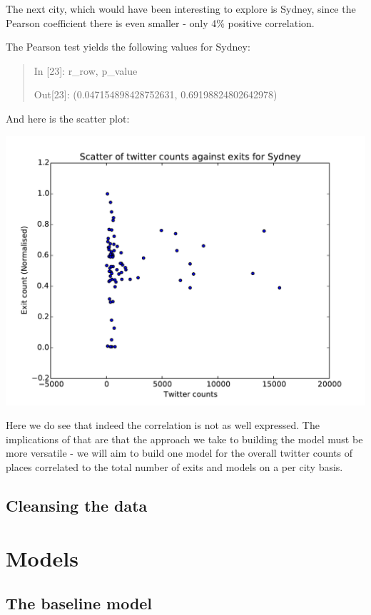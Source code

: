\documentclass[minf,frontabs,twoside,singlespacing,parskip]{infthesis}
\begin{document}
The next city, which would have been interesting to explore is Sydney, since the Pearson coefficient there is even smaller - only 4\% positive correlation. 

The Pearson test yields the following values for Sydney:
\begin{quotation}
In [23]: r\_row, p\_value

Out[23]: (0.047154898428752631, 0.69198824802642978)
\end{quotation}
\newpage
And here is the scatter plot:

\includegraphics[width=\textwidth]{Sydney_scatter}

Here we do see that indeed the correlation is not as well expressed. The implications of that are that the approach we take to building the model must be more versatile - we will aim to build one model for the overall twitter counts of places correlated to the total number of exits and models on a per city basis.

\section{Cleansing the data}



\chapter{Models}

\section{The baseline model}
\end{document}
